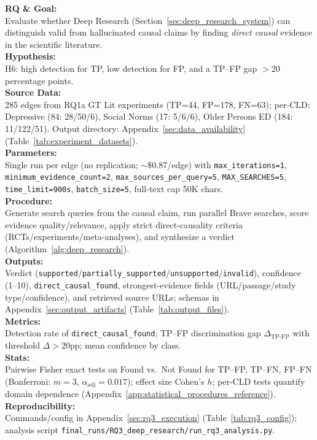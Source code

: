 \noindent\textbf{RQ \& Goal:}\\
Evaluate whether Deep Research (Section~\ref{sec:deep_research_system}) can distinguish valid from hallucinated causal claims by finding \emph{direct causal} evidence in the scientific literature.\\
\textbf{Hypothesis:}\\
H6: high detection for TP, low detection for FP, and a TP--FP gap $>$20 percentage points.\\
\textbf{Source Data:}\\
285 edges from RQ1a GT Lit experiments (TP=44, FP=178, FN=63); per-CLD: Depressive (84: 28/50/6), Social Norms (17: 5/6/6), Older Persons ED (184: 11/122/51). Output directory: Appendix~\ref{sec:data_availability} (Table~\ref{tab:experiment_datasets}).\\
\textbf{Parameters:}\\
Single run per edge (no replication; $\sim\$0.87$/edge) with \texttt{max\_iterations=1}, \texttt{minimum\_evidence\_count=2}, \texttt{max\_sources\_per\_query=5}, \texttt{MAX\_SEARCHES=5}, \texttt{time\_limit=900s}, \texttt{batch\_size=5}, full-text cap 50K chars.\\
\textbf{Procedure:}\\
Generate search queries from the causal claim, run parallel Brave searches, score evidence quality/relevance, apply strict direct-causality criteria (RCTs/experiments/meta-analyses), and synthesize a verdict (Algorithm~\ref{alg:deep_research}).\\
\textbf{Outputs:}\\
Verdict (\texttt{supported}/\texttt{partially\_supported}/\texttt{unsupported}/\texttt{invalid}), confidence (1--10), \texttt{direct\_causal\_found}, strongest-evidence fields (URL/passage/study type/confidence), and retrieved source URLs; schemas in Appendix~\ref{sec:output_artifacts} (Table~\ref{tab:output_files}).\\
\textbf{Metrics:}\\
Detection rate of \texttt{direct\_causal\_found}; TP--FP discrimination gap \(\Delta_{\text{TP-FP}}\) with threshold \(\Delta>20\)pp; mean confidence by class.\\
\textbf{Stats:}\\
Pairwise Fisher exact tests on Found vs.\ Not Found for TP--FP, TP--FN, FP--FN (Bonferroni: $m=3$, $\alpha_{\text{adj}}=0.017$); effect size Cohen's $h$; per-CLD tests quantify domain dependence (Appendix~\ref{app:statistical_procedures_reference}).\\
\textbf{Reproducibility:}\\
Commands/config in Appendix~\ref{sec:rq3_execution} (Table~\ref{tab:rq3_config}); analysis script \texttt{final\_runs/RQ3\_deep\_research/run\_rq3\_analysis.py}.

